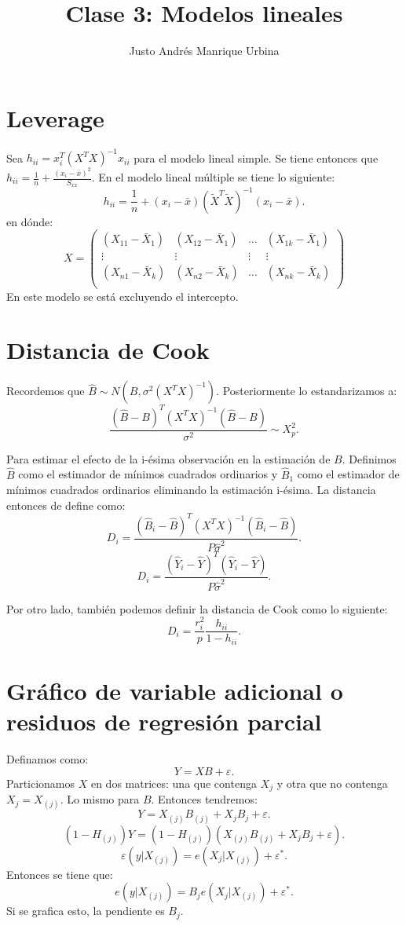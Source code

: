 \documentclass{article}
\title{Clase 3: Modelos lineales}
\author{Justo Andrés Manrique Urbina}
\begin{document}
\maketitle
\section{Leverage}
Sea $h_{ii}=x_{i}^{T}{(X^{T}X)}^{-1}x_{ii}$ para el modelo lineal simple. Se tiene entonces que $h_{ii}=\frac{1}{n}+\frac{{(x_{i}-\bar{x})}^{2}}{S_{xx}}$. En el modelo lineal múltiple se tiene lo siguiente:
\[ h_{ii}=\frac{1}{n}+{(x_{i}-\bar{x})}{(\tilde{X}^{T}\tilde{X})}^{-1}(x_{i}-\bar{x}).\]
en dónde:
\[
X= 
\begin{pmatrix}
	{(X_{11}-\bar{X}_{1})} & {(X_{12}-\bar{X}_{1})} & \ldots & {(X_{1k}-\bar{X}_{1})} \\
\vdots & \vdots & \vdots & \vdots \\
{(X_{n1}-\bar{X}_{k})} & {(X_{n2}-\bar{X}_{k})} & \ldots & {(X_{nk}-\bar{X}_{k})} \\
\end{pmatrix}
\]
En este modelo se está excluyendo el intercepto.

\section{Distancia de Cook}
Recordemos que $\hat{B} \sim N(B,\sigma^{2}{(X^{T}X)}^{-1})$. Posteriormente lo estandarizamos a:
\[ \frac{{(\hat{B}-B)}^{T}{(X^{T}X)}^{-1}{(\hat{B}-B)}}{\sigma^{2}} \sim X^{2}_{p}.\]

Para estimar el efecto de la i-ésima observación en la estimación de $B$. Definimos $\hat{B}$ como el estimador de mínimos cuadrados ordinarios y $\hat{B}_{1}$ como el estimador de mínimos cuadrados ordinarios eliminando la estimación i-ésima. La distancia entonces de define como:
\[ D_{i}=\frac{{(\hat{B}_{i}-\hat{B})}^{T}{(X^{T}X)}^{-1}{(\hat{B}_{i}-\hat{B})}}{P\hat{\sigma}^{2}}.\]
\[ D_{i}=\frac{{(\hat{Y}_{i}-\hat{Y})}^{T}{(\hat{Y}_{i}-\hat{Y})}}{P\hat{\sigma}^{2}}.\]

Por otro lado, también podemos definir la distancia de Cook como lo siguiente:
\[ D_{i}=\frac{r_{i}^{2}}{p}\frac{h_{ii}}{1-h_{ii}}.\]

\section{Gráfico de variable adicional o residuos de regresión parcial}
Definamos como:
\[ Y = XB + \varepsilon.\]
Particionamos $X$ en dos matrices: una que contenga $X_{j}$ y otra que no contenga $X_{j} = X_{(j)}$. Lo mismo para $B$. Entonces tendremos:
\[ Y = X_{(j)}B_{(j)}+X_{j}B_{j}+\varepsilon.\]
\[ (1-H_{(j)})Y=(1-H_{(j)})(X_{(j)}B_{(j)}+X_{j}B_{j}+\varepsilon).\]
\[ \varepsilon(y|X_{(j)})=e(X_{j}|X_{(j)})+\varepsilon^{*}.\]
Entonces se tiene que:
\[ e(y|X_{(j)})=B_{j}e(X_{j}|X_{(j)})+\varepsilon^{*}.\]
Si se grafica esto, la pendiente es $B_{j}$.
\end{document}
